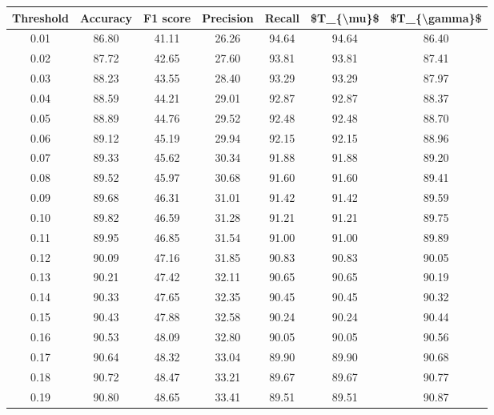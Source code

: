 \begin{tabular}{|c|c|c|c|c|c|c|}
\hline
 Threshold &  Accuracy &  F1 score &  Precision &  Recall &  \$T\_\{\textbackslash mu\}\$ &  \$T\_\{\textbackslash gamma\}\$ \\
\hline
      0.01 &     86.80 &     41.11 &      26.26 &   94.64 &      94.64 &         86.40 \\
      0.02 &     87.72 &     42.65 &      27.60 &   93.81 &      93.81 &         87.41 \\
      0.03 &     88.23 &     43.55 &      28.40 &   93.29 &      93.29 &         87.97 \\
      0.04 &     88.59 &     44.21 &      29.01 &   92.87 &      92.87 &         88.37 \\
      0.05 &     88.89 &     44.76 &      29.52 &   92.48 &      92.48 &         88.70 \\
      0.06 &     89.12 &     45.19 &      29.94 &   92.15 &      92.15 &         88.96 \\
      0.07 &     89.33 &     45.62 &      30.34 &   91.88 &      91.88 &         89.20 \\
      0.08 &     89.52 &     45.97 &      30.68 &   91.60 &      91.60 &         89.41 \\
      0.09 &     89.68 &     46.31 &      31.01 &   91.42 &      91.42 &         89.59 \\
      0.10 &     89.82 &     46.59 &      31.28 &   91.21 &      91.21 &         89.75 \\
      0.11 &     89.95 &     46.85 &      31.54 &   91.00 &      91.00 &         89.89 \\
      0.12 &     90.09 &     47.16 &      31.85 &   90.83 &      90.83 &         90.05 \\
      0.13 &     90.21 &     47.42 &      32.11 &   90.65 &      90.65 &         90.19 \\
      0.14 &     90.33 &     47.65 &      32.35 &   90.45 &      90.45 &         90.32 \\
      0.15 &     90.43 &     47.88 &      32.58 &   90.24 &      90.24 &         90.44 \\
      0.16 &     90.53 &     48.09 &      32.80 &   90.05 &      90.05 &         90.56 \\
      0.17 &     90.64 &     48.32 &      33.04 &   89.90 &      89.90 &         90.68 \\
      0.18 &     90.72 &     48.47 &      33.21 &   89.67 &      89.67 &         90.77 \\
      0.19 &     90.80 &     48.65 &      33.41 &   89.51 &      89.51 &         90.87 \\

\end{tabular}
